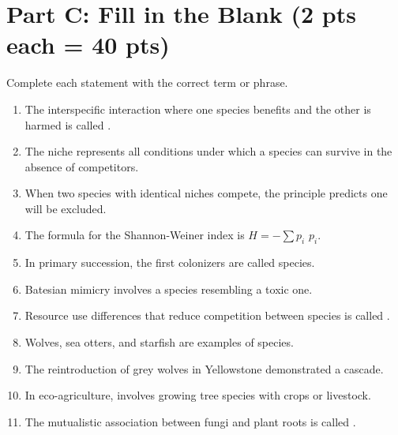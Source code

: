 \documentclass[11pt]{article}
\begin{document}
\clearpage

\section*{Part C: Fill in the Blank (2 pts each = 40 pts)}
Complete each statement with the correct term or phrase.

\begin{enumerate}[label=\textbf{\arabic*.}]
  \item The interspecific interaction where one species benefits and the other is harmed is called \underline{\hspace{3cm}}.
  \item The \underline{\hspace{3cm}} niche represents all conditions under which a species can survive in the absence of competitors.
  \item When two species with identical niches compete, the \underline{\hspace{3cm}} principle predicts one will be excluded.
  \item The formula for the Shannon-Weiner index is $H = -\sum p_i$ \underline{\hspace{2cm}} $p_i$.
  \item In primary succession, the first colonizers are called \underline{\hspace{3cm}} species.
  \item Batesian mimicry involves a \underline{\hspace{3cm}} species resembling a toxic one.
  \item Resource use differences that reduce competition between species is called \underline{\hspace{3cm}}.
  \item Wolves, sea otters, and starfish are examples of \underline{\hspace{3cm}} species.
  \item The reintroduction of grey wolves in Yellowstone demonstrated a \underline{\hspace{3cm}} cascade.
  \item In eco-agriculture, \underline{\hspace{3cm}} involves growing tree species with crops or livestock.
  \item The mutualistic association between fungi and plant roots is called \underline{\hspace{3cm}}.

\end{enumerate}
\end{document}

